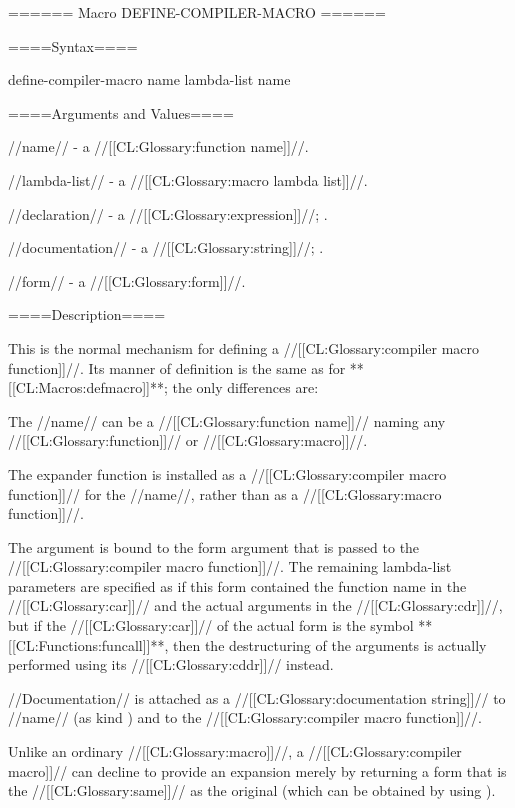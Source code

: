 ====== Macro DEFINE-COMPILER-MACRO ======


====Syntax====

\DefmacWithValuesNewline define-compiler-macro {name lambda-list {\DeclsAndDoc} } {name}

====Arguments and Values====

//name// - a //[[CL:Glossary:function name]]//.

//lambda-list// - a //[[CL:Glossary:macro lambda list]]//.

//declaration// - a  //[[CL:Glossary:expression]]//; \noeval.

//documentation// - a //[[CL:Glossary:string]]//; \noeval.

//form// - a //[[CL:Glossary:form]]//.

====Description====


This is the normal mechanism for defining a //[[CL:Glossary:compiler macro function]]//. Its manner of definition is the same as for **[[CL:Macros:defmacro]]**; the only differences are:

\beginlist \itemitem{\bull} The //name// can be a //[[CL:Glossary:function name]]// naming any //[[CL:Glossary:function]]// or //[[CL:Glossary:macro]]//.

\itemitem{\bull} The expander function is installed as a //[[CL:Glossary:compiler macro function]]// for the //name//, rather than as a //[[CL:Glossary:macro function]]//.

\itemitem{\bull} The  argument is bound to the form argument that is passed to the //[[CL:Glossary:compiler macro function]]//. The remaining lambda-list parameters are specified as if this form contained the function name in the //[[CL:Glossary:car]]// and the actual arguments in the //[[CL:Glossary:cdr]]//, but if the //[[CL:Glossary:car]]// of the actual form is the symbol **[[CL:Functions:funcall]]**, then the destructuring of the arguments is actually performed using its //[[CL:Glossary:cddr]]// instead.

\itemitem{\bull} //Documentation// is attached as a //[[CL:Glossary:documentation string]]// to //name// (as kind ) and to the //[[CL:Glossary:compiler macro function]]//.

\itemitem{\bull} Unlike an ordinary //[[CL:Glossary:macro]]//, a //[[CL:Glossary:compiler macro]]// can decline to provide an expansion merely by returning a form that is the //[[CL:Glossary:same]]// as the original (which can be obtained by using ). \endlist

